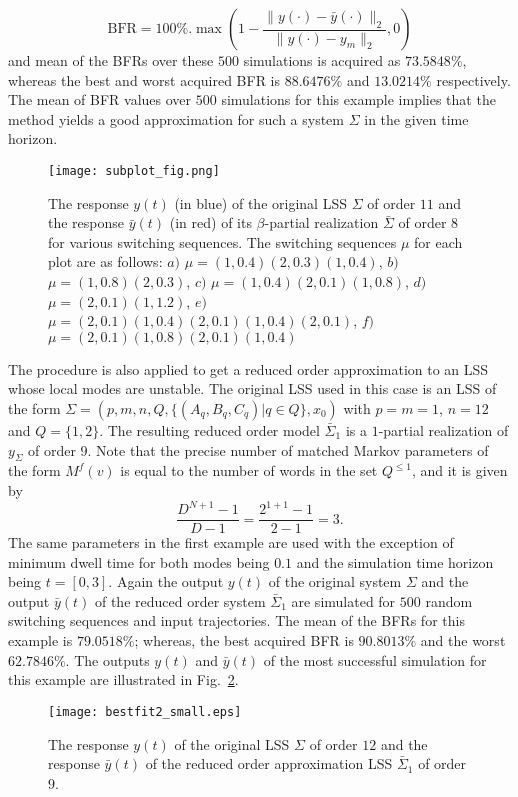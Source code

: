 \documentclass[journal]{IEEEtran}
\providecommand{\norm}[1]{\lVert#1\rVert}
\begin{document}
\[
\mbox{BFR}=100 \%. \max \left( 1-\frac{\norm{y(\cdot)-\bar{y}(\cdot)}_2}{\norm{y(\cdot)-y_m}_2},0 \right)
\]
and mean of the BFRs over these $500$ simulations is acquired as $73.5848\%$, whereas the best and worst acquired BFR is $88.6476\%$ and $13.0214
\%$ respectively. The mean of BFR values over $500$ simulations for this example implies that the method yields a good approximation for such a system $\Sigma$ in the given time horizon.
\begin{figure}
	\centering
	\texttt{[image: subplot\_fig.png]}
	\caption{The response $y(t)$ (in blue) of the original LSS $\Sigma$ of order $11$ and the response $\bar{y}(t)$ (in red) of its $\beta$-partial realization $\bar{\Sigma}$ of order $8$ for various switching sequences. The switching sequences $\mu$ for each plot are as follows: $a)$ $\mu= (1,0.4)(2,0.3)(1,0.4)$, $b)$ $\mu=(1,0.8)(2,0.3)$, $c)$ $\mu=(1,0.4)(2,0.1)(1,0.8)$, $d)$ $\mu=(2,0.1)(1,1.2)$, $e)$ $\mu=(2,0.1)(1,0.4)(2,0.1)(1,0.4)(2,0.1)$, $f)$ $\mu=(2,0.1)(1,0.8)(2,0.1)(1,0.4)$}
	\label{fig:example1}
\end{figure}

The procedure is also applied to get a reduced order approximation to an LSS whose local modes are unstable. The original LSS used in this case is an LSS of the form $\Sigma=(p,m,n,Q,\{(A_q,B_q,C_q)|q \in Q\},x_0)$ with $p=m=1$, $n=12$ and $Q=\{1,2\}$. The resulting reduced order model $\bar{\Sigma}_1$ is a $1$-partial realization of $y_{\Sigma}$ of order $9$. Note that the precise number of matched Markov parameters of the form $M^f(v)$ is equal to the number of words in the set $Q^{\leq 1}$, and it is given by
\[
\frac{D^{N+1}-1}{D-1}=\frac{2^{1+1}-1}{2-1}=3.
\]
The same parameters in the first example are used with the exception of minimum dwell time for both modes being $0.1$ and the simulation time horizon being $t=[0,3]$. Again the output $y(t)$ of the original system $\Sigma$ and the output $\bar{y}(t)$ of the reduced order system $\bar{\Sigma}_1$ are simulated for $500$ random switching sequences and input trajectories. The mean of the BFRs for this example is $79.0518\%$; whereas, the best acquired BFR is $90.8013\%$ and the worst $62.7846\%$. The outputs $y(t)$ and $\bar{y}(t)$ of the most successful simulation for this example are illustrated in Fig.~\ref{fig:example2}.
\begin{figure}
	\centering
	\texttt{[image: bestfit2\_small.eps]}
	\caption{The response $y(t)$ of the original LSS $\Sigma$ of order $12$ and the response $\bar{y}(t)$ of the reduced order approximation LSS $\bar{\Sigma}_1$ of order $9$.}
	\label{fig:example2}
\end{figure}
\end{document}
